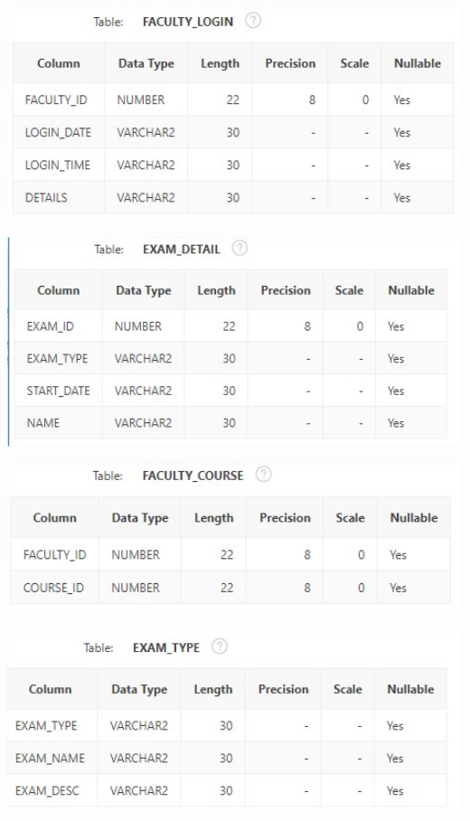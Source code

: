\documentclass[12pt,letterpaper]{article}
\begin{document}
		
\begin{center}
\includegraphics[width=15cm]{./llatasiImagen/tabla7}
\end{center}		
		
		
\begin{center}
\includegraphics[width=15cm]{./llatasiImagen/tabla8}
\end{center}		
		
		
\begin{center}
\includegraphics[width=15cm]{./llatasiImagen/tabla9}
\end{center}		
		
		
\begin{center}
\includegraphics[width=15cm]{./llatasiImagen/tabla10}
\end{center}		
		
\end{document}
